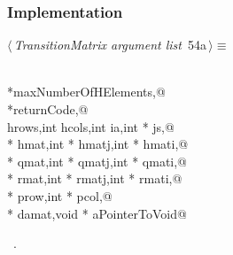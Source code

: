 \documentclass{article}
\begin{document}
\subsubsection{Implementation}


\begin{flushleft} \small
\begin{minipage}{\linewidth}\label{scrap79}\raggedright\small
{} $\langle\,${\itshape TransitionMatrix argument list}\nobreak\ {\footnotesize {54a}}$\,\rangle\equiv$
\vspace{-1ex}
\begin{list}{}{} \item
\mbox{}\verb@@\\
\mbox{}\verb@int *maxNumberOfHElements,@\\
\mbox{}\verb@int *returnCode,@\\
\mbox{}\verb@int hrows,int hcols,int ia,int * js,@\\
\mbox{}\verb@double * hmat,int * hmatj,int * hmati,@\\
\mbox{}\verb@double * qmat,int * qmatj,int * qmati,@\\
\mbox{}\verb@double * rmat,int * rmatj,int * rmati,@\\
\mbox{}\verb@int * prow,int * pcol,@\\
\mbox{}\verb@double * damat,void * aPointerToVoid@{\NWsep}
\end{list}
\vspace{-1.5ex}
\footnotesize
\begin{list}{}{\setlength{\itemsep}{-\parsep}\setlength{\itemindent}{-\leftmargin}}
\item \NWtxtMacroRefIn\ .

\end{list}
\end{minipage}
\end{flushleft}
\end{document}
